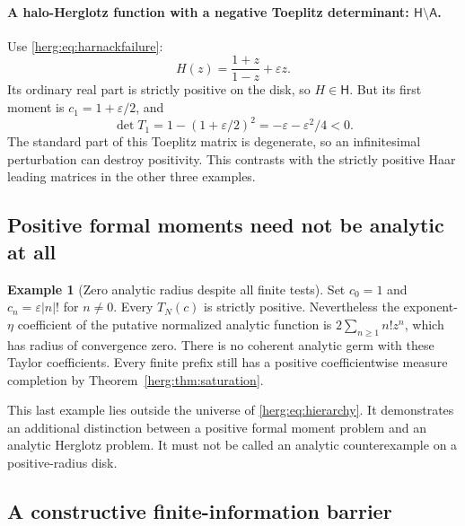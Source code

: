 \documentclass[11pt,letterpaper]{article}
\theoremstyle{definition}
\newtheorem{example}[theorem]{Example}
\newcommand{\eps}{\varepsilon}
\numberwithin{equation}{section}
\begin{document}
\paragraph{A halo-Herglotz function with a negative Toeplitz determinant: $\mathsf H\setminus\mathsf A$.}
Use \eqref{herg:eq:harnackfailure}:
\[
 H(z)=\frac{1+z}{1-z}+\eps z.
\]
Its ordinary real part is strictly positive on the disk, so $H\in\mathsf H$. But its first moment is $c_1=1+\eps/2$, and
\begin{equation}\label{herg:eq:negativeT1}
 \det T_1=1-(1+\eps/2)^2=-\eps-\eps^2/4<0.
\end{equation}
The standard part of this Toeplitz matrix is degenerate, so an infinitesimal perturbation can destroy positivity. This contrasts with the strictly positive Haar leading matrices in the other three examples.

\subsection{Positive formal moments need not be analytic at all}

\begin{example}[Zero analytic radius despite all finite tests]\label{herg:ex:factorial}
Set $c_0=1$ and $c_n=\eps |n|!$ for $n\ne0$. Every $T_N(c)$ is strictly positive. Nevertheless the exponent-$\eta$ coefficient of the putative normalized analytic function is $2\sum_{n\ge1}n!z^n$, which has radius of convergence zero. There is no coherent analytic germ with these Taylor coefficients. Every finite prefix still has a positive coefficientwise measure completion by Theorem~\ref{herg:thm:saturation}.
\end{example}

This last example lies outside the universe of \eqref{herg:eq:hierarchy}. It demonstrates an additional distinction between a positive formal moment problem and an analytic Herglotz problem. It must not be called an analytic counterexample on a positive-radius disk.

\subsection{A constructive finite-information barrier}
\end{document}

